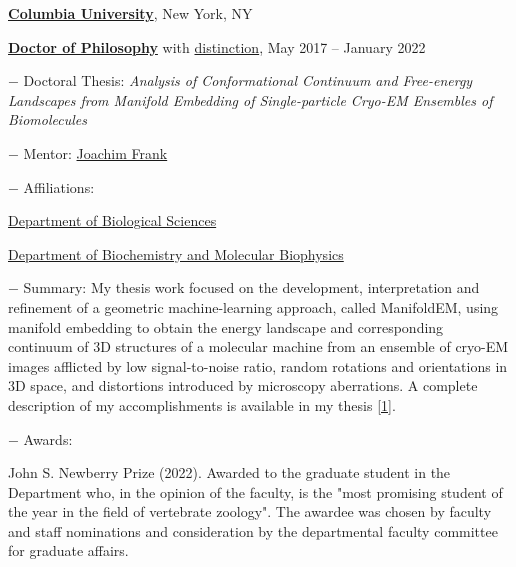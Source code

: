 \documentclass[10pt]{article}
\begin{document}
	\href{https://www.columbia.edu/}{\textbf{Columbia University}},
	New York, NY
	\begin{outerlist}
		
	\item[] \href{https://www.parchment.com/u/award/e36ca938bf02252b0de6b64c5800e246} {\textbf{Doctor of Philosophy}} with \href{https://www.evanseitz.com/uploads/thesis_dist.pdf}{distinction}, May 2017 -- January 2022
	
	\begin{innerlist}
		\item[$-$] Doctoral Thesis:
			\emph{Analysis of Conformational Continuum and Free-energy Landscapes from Manifold Embedding of Single-particle Cryo-EM Ensembles of Biomolecules}
		\item[$-$] Mentor:
		\href{https://joachimfranklab.org/}%
		{Joachim Frank}
		\item[$-$] Affiliations:
			\begin{innerlist}
				\item[] \href{https://www.biology.columbia.edu/}{Department of Biological Sciences}
				\item[] \href{https://www.biochem.cuimc.columbia.edu/}{Department of Biochemistry and Molecular Biophysics}
			\end{innerlist}	
		\item[$-$] Summary:	My thesis work focused on the development, interpretation and refinement of a geometric machine-learning approach, called ManifoldEM, using manifold embedding to obtain the energy landscape and corresponding continuum of 3D structures of a molecular machine from an ensemble of cryo-EM images afflicted by low signal-to-noise ratio, random rotations and orientations in 3D space, and distortions introduced by microscopy aberrations. A complete description of my accomplishments is available in my thesis \href{https://academiccommons.columbia.edu/doi/10.7916/4n0v-wa24} {[1]}.
		\item[$-$] Awards:
			\begin{innerlist}
			\item[] John S. Newberry Prize (2022). Awarded to the graduate student in the Department who, in the opinion of the faculty, is the "most promising student of the year in the field of vertebrate zoology". The awardee was chosen by faculty and staff nominations and consideration by the departmental faculty committee for graduate affairs.
			\end{innerlist}		

	\end{innerlist}


\end{outerlist}
\end{document}
